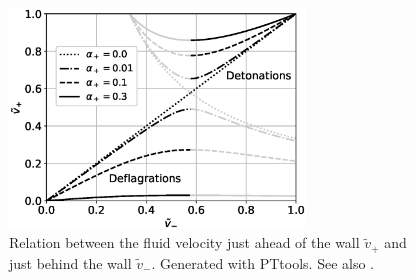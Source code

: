 \begin{figure}[ht!]
\centering
\includegraphics[width=0.7\textwidth]{fig/vm_vp_plane.eps}
\caption{Relation between the fluid velocity just ahead of the wall $\tilde{v}_+$ and just behind the wall $\tilde{v}_-$. Generated with PTtools. See also \cite[fig. 13]{lecture_notes}.}
\label{fig:vplus_vminus}
\end{figure}

